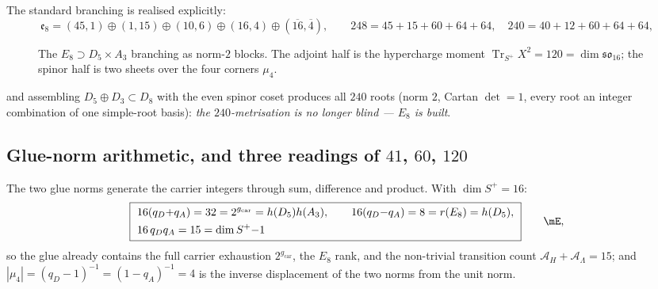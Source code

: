 \documentclass[11pt,a4paper]{article}
\newcommand{\gcar}{g_{\mathrm{car}}}
\newcommand{\AL}{\mathcal A_\Lambda}
\newcommand{\AH}{\mathcal A_H}
\theoremstyle{definition}
\begin{document}
\noindent The standard branching is realised explicitly:
\begin{equation}
  \mathfrak e_8=(45,1)\oplus(1,15)\oplus(10,6)\oplus(16,4)\oplus(\overline{16},\overline4),\qquad
  248=45{+}15{+}60{+}64{+}64,\quad 240=40{+}12{+}60{+}64{+}64 ,
\end{equation}

\begin{figure}[ht]
\centering
{}
\caption{The $E_8\supset D_5\times A_3$ branching as norm-$2$ blocks. The adjoint half is the
hypercharge moment $\operatorname{Tr}_{S^+}X^2=120=\dim\mathfrak{so}_{16}$; the spinor half is two
sheets over the four corners $\mu_4$.}
\label{fig:e8blocks}
\end{figure}
and assembling $D_5\oplus D_3\subset D_8$ with the even spinor coset produces all $240$ roots
(norm $2$, Cartan $\det=1$, every root an integer combination of one simple-root basis): \emph{the
$240$-metrisation is no longer blind --- $E_8$ is built}. \mE

\subsection{Glue-norm arithmetic, and three readings of $41$, $60$, $120$}
The two glue norms generate the carrier integers through sum, difference and product. With
$\dim S^+=16$:
\begin{equation}
  \boxed{\ \begin{aligned}
    &16(q_D{+}q_A)=32=2^{\gcar}=h(D_5)h(A_3),\qquad 16(q_D{-}q_A)=8=r(E_8)=h(D_5),\\
    &16\,q_Dq_A=15=\dim S^+{-}1
  \end{aligned}\ }\qquad\mE ,
\end{equation}
so the glue already contains the full carrier exhaustion $2^{\gcar}$, the $E_8$ rank, and the
non-trivial transition count $\AH{+}\AL=15$; and $|\mu_4|=(q_D-1)^{-1}=(1-q_A)^{-1}=4$ is the inverse
displacement of the two norms from the unit norm.
\end{document}
